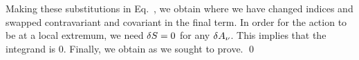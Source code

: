 {	Making these substitutions in Eq.~, we obtain
	where we have changed indices and swapped contravariant and covariant in the final term.  In order for the action to be at a local extremum, we need $\delta S = 0$ for any $\delta A_\nu$.  This implies that the integrand is 0.  Finally, we obtain
	as we sought to prove. \qed
}

%
%



